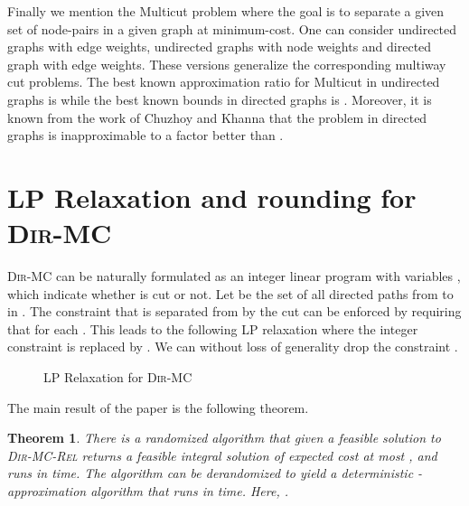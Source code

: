 \documentclass[11pt]{article}
\newtheorem{theorem}[lemma]{Theorem}
\def\DirMC{\textsc{Dir-MC}\xspace}
\def\DirMCRel{\textsc{Dir-MC-Rel}\xspace}
\begin{document}
Finally we mention the {\sc Multicut} problem where the goal is to
separate a given set of  node-pairs  in
a given graph at minimum-cost. One can consider undirected graphs with
edge weights, undirected graphs with node weights and directed graph
with edge weights.  These versions generalize the corresponding
multiway cut problems. The best known approximation ratio for {\sc
  Multicut} in undirected graphs is  \cite{GVY,GargVY94}
while the best known bounds in directed graphs is  \cite{AgarwalAC07}. Moreover, it is known from
the work of Chuzhoy and Khanna \cite{ChuzhoyK09} that the problem in
directed graphs is inapproximable to a factor better than
.


\section{LP Relaxation and rounding for \DirMC}
\label{sec:dir-mc}

\DirMC can be naturally formulated as an integer linear program with
variables ,  which indicate whether  is
cut or not. Let  be the set of all directed paths from 
to  in .  The constraint that  is separated from  by
the cut can be enforced by requiring that 
for each .  This leads to the following LP relaxation
where the integer constraint  is replaced by . We can without loss of generality drop the constraint .

\begin{figure}[htb]
  \centering
\begin{boxedminipage}{0.5\linewidth}
\vspace{-0.2in}

\end{boxedminipage}
  \caption{LP Relaxation for \DirMC}
  \label{fig:dirmc-lp}
\end{figure}

The main result of the paper is the following theorem.

\begin{theorem}\label{thm:directed_cut_approximation}
  There is a randomized algorithm that given a
  feasible solution  to {\sc \DirMCRel} returns a feasible
  integral solution of expected cost at most , and
  runs in  time. The algorithm can be 
  derandomized to yield a deterministic -approximation algorithm 
  that runs in  time. Here, .
\end{theorem}
\end{document}
